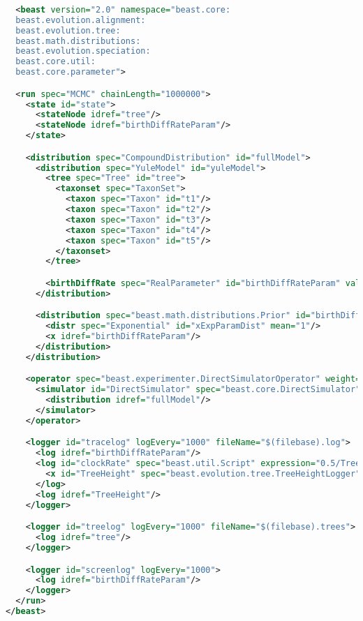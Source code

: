 \documentclass[oneside]{article}
\begin{document}
{\small
\singlespacing
\begin{lstlisting}[language=XML, caption=BEAST 2 control file for
  sampling a distribution under the Yule model with MCMC., label={lst:yulemcmc}]
  
  <beast version="2.0" namespace="beast.core:
  beast.evolution.alignment:
  beast.evolution.tree:
  beast.math.distributions:
  beast.evolution.speciation:
  beast.core.util:
  beast.core.parameter">

  <run spec="MCMC" chainLength="1000000">
    <state id="state">
      <stateNode idref="tree"/>
      <stateNode idref="birthDiffRateParam"/>
    </state>

    <distribution spec="CompoundDistribution" id="fullModel">
      <distribution spec="YuleModel" id="yuleModel">
        <tree spec="Tree" id="tree">
          <taxonset spec="TaxonSet">
            <taxon spec="Taxon" id="t1"/>
            <taxon spec="Taxon" id="t2"/>
            <taxon spec="Taxon" id="t3"/>
            <taxon spec="Taxon" id="t4"/>
            <taxon spec="Taxon" id="t5"/>
          </taxonset>
        </tree>

        <birthDiffRate spec="RealParameter" id="birthDiffRateParam" value="1.0"/>
      </distribution>

      <distribution spec="beast.math.distributions.Prior" id="birthDiffRatePrior">
        <distr spec="Exponential" id="xExpParamDist" mean="1"/>
        <x idref="birthDiffRateParam"/>
      </distribution>
    </distribution>

    <operator spec="beast.experimenter.DirectSimulatorOperator" weight="1" state="@state">
      <simulator id="DirectSimulator" spec="beast.core.DirectSimulator" nSamples="1">
        <distribution idref="fullModel"/>
      </simulator>
    </operator>

    <logger id="tracelog" logEvery="1000" fileName="$(filebase).log">
      <log idref="birthDiffRateParam"/>
      <log id="clockRate" spec="beast.util.Script" expression="0.5/TreeHeight">
        <x id="TreeHeight" spec="beast.evolution.tree.TreeHeightLogger" tree="@tree"/>
      </log>
      <log idref="TreeHeight"/>
    </logger>

    <logger id="treelog" logEvery="1000" fileName="$(filebase).trees">
      <log idref="tree"/>
    </logger>

    <logger id="screenlog" logEvery="1000">
      <log idref="birthDiffRateParam"/>
    </logger>
  </run>
</beast>
\end{lstlisting}
}
\end{document}
